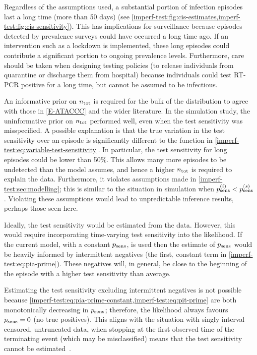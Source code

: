\documentclass[thesis.tex]{subfiles}
\begin{document}
Regardless of the assumptions used, a substantial portion of infection episodes last a long time (\eg more than 50 days) (see \cref{imperf-test:fig:cis-estimates,imperf-test:fig:cis-sensitivity}).
This has implications for surveillance because episodes detected by prevalence surveys could have occurred a long time ago.
If an intervention such as a lockdown is implemented, these long episodes could contribute a significant portion to ongoing prevalence levels.
Furthermore, care should be taken when designing testing policies (\eg to release individuals from quarantine or discharge them from hospital) because individuals could test RT-PCR positive for a long time, but cannot be assumed to be infectious.

An informative prior on $n_\text{tot}$ is required for the bulk of the distribution to agree with those in \cref{E-ATACCC} and the wider literature.
In the simulation study, the uninformative prior on $n_\text{tot}$ performed well, even when the test sensitivity was misspecified.
A possible explanation is that the true variation in the test sensitivity over an episode is significantly different to the function in \cref{imperf-test:eq:variable-test-sensitivity}.
In particular, the test sensitivity for long episodes could be lower than 50\%.
This allows many more episodes to be undetected than the model assumes, and hence a higher $n_\text{tot}$ is required to explain the data.
Furthermore, it violates assumptions made in \cref{imperf-test:sec:modelling}; this is similar to the situation in simulation when $p_\text{sens}^{(i)} < p_\text{sens}^{(s)}$.
Violating these assumptions would lead to unpredictable inference results, perhaps those seen here.

Ideally, the test sensitivity would be estimated from the data.
However, this would require incorporating time-varying test sensitivity into the likelihood.
If the current model, with a constant $p_\text{sens}$, is used then the estimate of $p_\text{sens}$ would be heavily informed by intermittent negatives (the first, constant term in \cref{imperf-test:eq:pia-prime}).
These negatives will, in general, be close to the beginning of the episode with a higher test sensitivity than average.

Estimating the test sensitivity excluding intermittent negatives is not possible because \cref{imperf-test:eq:pia-prime-constant,imperf-test:eq:pit-prime} are both monotonically decreasing in $p_\text{sens}$; therefore, the likelihood always favours $p_\text{sens} = 0$ (\ie no true positives).
This aligns with the situation with singly interval censored, untruncated data, when stopping at the first observed time of the terminating event (which may be misclassified) means that the test sensitivity cannot be estimated~\autocite[e.g.][]{titmanMisclassify}.
\end{document}
